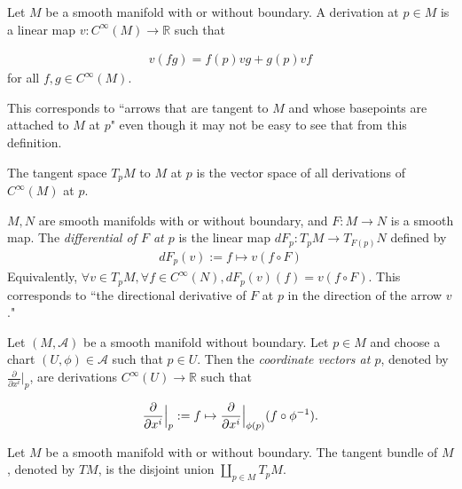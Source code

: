 \begin{defn}[Derivation]
  Let $M$ be a smooth manifold with or without boundary.
  A derivation at $p \in M$ is a linear map $v: C^{\infty}(M) \rightarrow \mathbb{R}$ such that 

  \begin{align*}
    v(fg) = f(p)vg + g(p)vf
  \end{align*}
  for all $f, g \in C^{\infty}(M)$.

  This corresponds to ``arrows that are tangent to $M$ and whose basepoints are attached to $M$ at $p$" even though it may not be easy to see that from this definition.
\end{defn}

\begin{defn}
  The tangent space $T_pM$ to $M$ at $p$ is the vector space of all derivations of $C^{\infty}(M)$ at $p$.
\end{defn}

\begin{defn}[Differential]
  $M, N$ are smooth manifolds with or without boundary, and $F: M \rightarrow N$ is a smooth map.
  The \textit{differential of $F$ at $p$} is the linear map $dF_p: T_pM \rightarrow T_{F(p)}N$ defined by 
  \begin{align*}
    dF_p(v) := f \mapsto v(f \circ F)
  \end{align*}
  Equivalently, $\forall v \in T_pM, \forall f \in C^{\infty}(N), dF_p(v)(f) = v(f \circ F)$.
  This corresponds to ``the directional derivative of $F$ at $p$ in the direction of the arrow $v$."
\end{defn}

\begin{defn}
  Let $(M, \mathcal{A})$ be a smooth manifold without boundary.
  Let $p \in M$ and choose a chart $(U, \phi) \in \mathcal{A}$ such that $p \in U$.
  Then the \textit{coordinate vectors at $p$}, denoted by $\frac{\partial}{\partial x^i}\vert_p$, are derivations $C^{\infty}(U) \rightarrow \mathbb{R}$ such that

  \begin{align*}
    \frac{\partial}{\partial x^i}\Big{\vert}_p := f \mapsto \frac{\partial}{\partial x^i}\Big{\vert}_{\phi(p)}(f \circ \phi^{-1}).
  \end{align*}
\end{defn}

\begin{defn}
  Let $M$ be a smooth manifold with or without boundary.
  The tangent bundle of $M$, denoted by $TM$, is the disjoint union $\coprod_{p \in M} T_pM$.
\end{defn}

